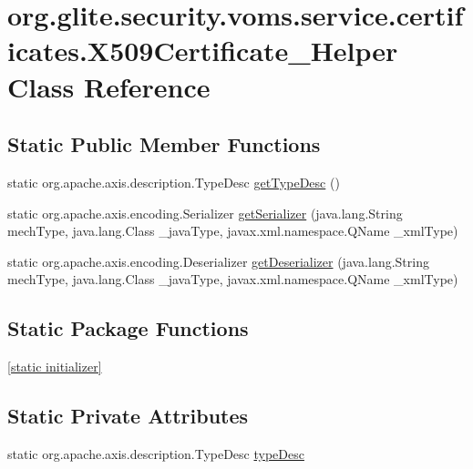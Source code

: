 \hypertarget{classorg_1_1glite_1_1security_1_1voms_1_1service_1_1certificates_1_1X509Certificate__Helper}{
\section{org.glite.security.voms.service.certificates.X509Certificate\_\-Helper Class Reference}
\label{classorg_1_1glite_1_1security_1_1voms_1_1service_1_1certificates_1_1X509Certificate__Helper}
}
\subsection*{Static Public Member Functions}
\begin{DoxyCompactItemize}
\item 
static org.apache.axis.description.TypeDesc \hyperlink{classorg_1_1glite_1_1security_1_1voms_1_1service_1_1certificates_1_1X509Certificate__Helper_a69cd903d9ffa31c7ab151537d4cf6be4}{getTypeDesc} ()
\item 
static org.apache.axis.encoding.Serializer \hyperlink{classorg_1_1glite_1_1security_1_1voms_1_1service_1_1certificates_1_1X509Certificate__Helper_a4bb53764e97efe19a60ede4c6b43bdcc}{getSerializer} (java.lang.String mechType, java.lang.Class \_\-javaType, javax.xml.namespace.QName \_\-xmlType)
\item 
static org.apache.axis.encoding.Deserializer \hyperlink{classorg_1_1glite_1_1security_1_1voms_1_1service_1_1certificates_1_1X509Certificate__Helper_a2e07b69f0a083a86cd74360f24b6934b}{getDeserializer} (java.lang.String mechType, java.lang.Class \_\-javaType, javax.xml.namespace.QName \_\-xmlType)
\end{DoxyCompactItemize}
\subsection*{Static Package Functions}
\begin{DoxyCompactItemize}
\item 
\hyperlink{classorg_1_1glite_1_1security_1_1voms_1_1service_1_1certificates_1_1X509Certificate__Helper_a1a8197e98ef5f61380d4540be263d4bf}{\mbox{[}static initializer\mbox{]}}
\end{DoxyCompactItemize}
\subsection*{Static Private Attributes}
\begin{DoxyCompactItemize}
\item 
static org.apache.axis.description.TypeDesc \hyperlink{classorg_1_1glite_1_1security_1_1voms_1_1service_1_1certificates_1_1X509Certificate__Helper_ac7c60205759f7891f36ca756d0ce950f}{typeDesc}
\end{DoxyCompactItemize}


